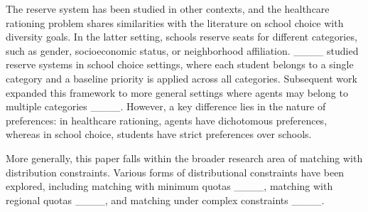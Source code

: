 The reserve system has been studied in other contexts, and the healthcare rationing problem shares similarities with the literature on school choice with diversity goals. In the latter setting, schools reserve seats for different categories, such as gender, socioeconomic status, or neighborhood affiliation. ____ studied reserve systems in school choice settings, where each student belongs to a single category and a baseline priority is applied across all categories. Subsequent work expanded this framework to more general settings where agents may belong to multiple categories ____. However, a key difference lies in the nature of preferences: in healthcare rationing, agents have dichotomous preferences, whereas in school choice, students have strict preferences over schools.


More generally, this paper falls within the broader research area of matching with distribution constraints. Various forms of distributional constraints have been explored, including matching with minimum quotas ____, matching with regional quotas ____, and matching under complex constraints ____.


